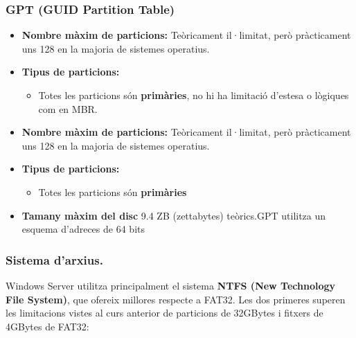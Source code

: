 \documentclass[
  a4paper,
]{article}
\providecommand{\tightlist}{%
  \setlength{\itemsep}{0pt}\setlength{\parskip}{0pt}}
\begin{document}
\subsubsection{GPT (GUID Partition
Table)}\label{gpt-guid-partition-table}

\begin{itemize}
\tightlist
\item
  \textbf{Nombre màxim de particions:} Teòricament il·limitat, però
  pràcticament uns 128 en la majoria de sistemes operatius.
\item
  \textbf{Tipus de particions:}

  \begin{itemize}
  \tightlist
  \item
    Totes les particions són \textbf{primàries}, no hi ha limitació
    d'estesa o lògiques com en MBR.
  \end{itemize}
\item
  \textbf{Nombre màxim de particions:} Teòricament il·limitat, però
  pràcticament uns 128 en la majoria de sistemes operatius.
\item
  \textbf{Tipus de particions:}

  \begin{itemize}
  \tightlist
  \item
    Totes les particions són \textbf{primàries}
  \end{itemize}
\item
  \textbf{Tamany màxim del disc} 9.4 ZB (zettabytes) teòrics.GPT
  utilitza un esquema d'adreces de 64 bits
\end{itemize}

\subsubsection{Sistema d'arxius.}\label{sistema-darxius.}

Windows Server utilitza principalment el sistema \textbf{NTFS (New
Technology File System)}, que ofereix millores respecte a FAT32. Les dos
primeres superen les limitacions vistes al curs anterior de particions
de 32GBytes i fitxers de 4GBytes de FAT32:
\end{document}
